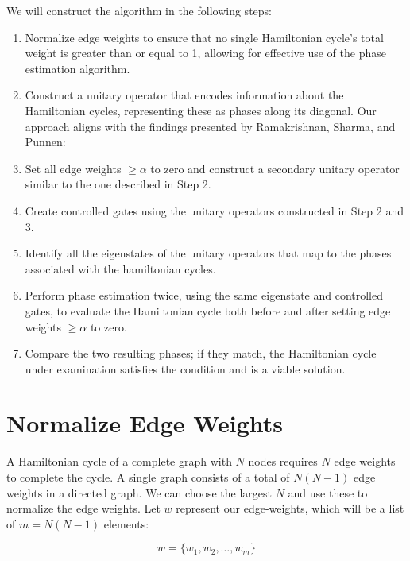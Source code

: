 \documentclass[msc,oneside]{ubcthesis}
\begin{document}
	We will construct the algorithm in the following steps:
	\begin{enumerate}
		\item Normalize edge weights to ensure that no single Hamiltonian cycle's total weight is greater than or equal to 1, allowing for effective use of the phase estimation algorithm.\\
		\item Construct a unitary operator that encodes information about the Hamiltonian cycles, representing these as phases along its diagonal. Our approach aligns with the findings presented by Ramakrishnan, Sharma, and Punnen: \cite{srinivasan2018efficient}\\
		\item Set all edge weights $\geq \alpha$ to zero and construct a secondary unitary operator similar to the one described in Step 2.\\
		\item Create controlled gates using the unitary operators constructed in Step 2 and 3.\\
		\item Identify all the eigenstates of the unitary operators that map to the phases associated with the hamiltonian cycles.\\
		\item Perform phase estimation twice, using the same eigenstate and controlled gates, to evaluate the Hamiltonian cycle both before and after setting edge weights $\geq \alpha$ to zero.\\
		\item Compare the two resulting phases; if they match, the Hamiltonian cycle under examination satisfies the condition and is a viable solution.\\
		
	\end{enumerate}
		
	\section{Normalize Edge Weights}
	
		A Hamiltonian cycle of a complete graph with $N$ nodes requires $N$ edge weights to complete the cycle. A single graph consists of a total of $N(N-1)$ edge weights in a directed graph. We can choose the largest $N$ and use these to normalize the edge weights. Let $w$ represent our edge-weights, which will be a list of $m = N(N-1)$ elements:
	
	$$w = \{w_1, w_2, \ldots, w_m\}$$ 
	
\end{document}
